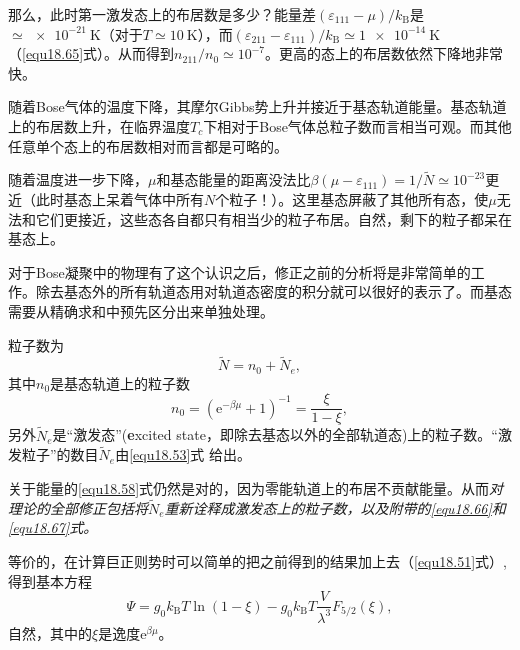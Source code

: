 那么，此时第一激发态上的布居数是多少？能量差$(\varepsilon_{111}-\mu)/k_\text{B}$是$\simeq\SI{e-21}{\kelvin}$（对于$T\simeq\SI{10}{\kelvin}$），而$(\varepsilon_{211}-\varepsilon_{111})/k_\text{B}\simeq\SI{1e-14}{\kelvin}$（\ref{equ18.65}式）。从而得到$n_{211}/n_0\simeq 10^{-7}$。更高的态上的布居数依然下降地非常快。

随着Bose气体的温度下降，其摩尔Gibbs势上升并接近于基态轨道能量。基态轨道上的布居数上升，在临界温度$T_c$下相对于Bose气体总粒子数而言相当可观。而其他任意单个态上的布居数相对而言都是可略的。

随着温度进一步下降，$\mu$和基态能量的距离没法比$\beta(\mu-\varepsilon_{111})=1/\tilde N\simeq 10^{-23}$更近（此时基态上呆着气体中所有$N$个粒子！）。这里基态屏蔽了其他所有态，使$\mu$无法和它们更接近，这些态各自都只有相当少的粒子布居。自然，剩下的粒子都呆在基态上。

对于Bose凝聚中的物理有了这个认识之后，修正之前的分析将是非常简单的工作。除去基态外的所有轨道态用对轨道态密度的积分就可以很好的表示了。而基态需要从精确求和中预先区分出来单独处理。

粒子数为
\begin{equation}
\tilde N = n_0+\tilde N_e,
\label{equ18.66}
\end{equation}
其中$n_0$是基态轨道上的粒子数
\begin{equation}
n_0=\left(\mathrm e^{-\beta\mu}+1\right)^{-1}=\frac{\xi}{1-\xi},
\label{equ18.67}
\end{equation}
另外$\tilde N_e$是``激发态''({\bf e}xcited state，即除去基态以外的全部轨道态)上的粒子数。``激发粒子''的数目$\tilde N_e$由\eqref{equ18.53}式%
%
给出。

关于能量的\eqref{equ18.58}式仍然是对的，因为零能轨道上的布居不贡献能量。从而{\it 对理论的全部修正包括将$\tilde N_e$重新诠释成激发态上的粒子数，以及附带的\eqref{equ18.66}和\eqref{equ18.67}式。}

等价的，在计算巨正则势时可以简单的把之前得到的结果加上去（\eqref{equ18.51}式）,得到基本方程
\begin{equation}
\Psi=g_0k_\text{B}T\ln(1-\xi)-g_0k_\text{B}T\frac{V}{\lambda^3}F_{5/2}(\xi),
\label{equ18.68}
\end{equation}
自然，其中的$\xi$是逸度$\mathrm e^{\beta\mu}$。

